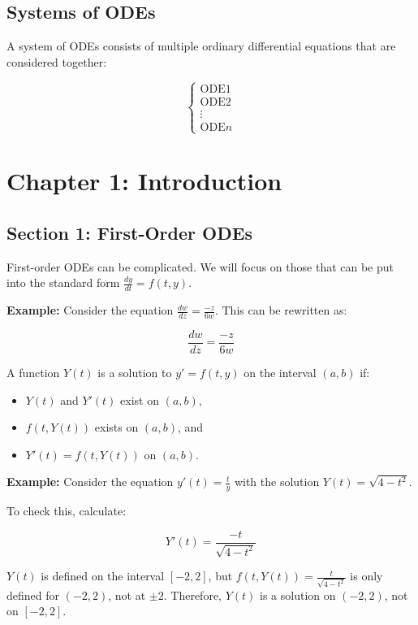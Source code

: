 \documentclass{article}
\begin{document}
\subsection*{Systems of ODEs}

A system of ODEs consists of multiple ordinary differential equations that are considered together:

\[
\left\{
\begin{array}{l}
\text{ODE} 1 \\
\text{ODE} 2 \\
\vdots \\
\text{ODE} n
\end{array}
\right.
\]

\section*{Chapter 1: Introduction}

\subsection*{Section 1: First-Order ODEs}

First-order ODEs can be complicated. We will focus on those that can be put into the standard form \(\boxed{\frac{dy}{dt} = f(t, y)}\).

\textbf{Example:} Consider the equation \(\frac{dw}{dz} = \frac{-z}{6w}\). This can be rewritten as:

\[
\frac{dw}{dz} = \frac{-z}{6w}
\]

A function \(Y(t)\) is a solution to \(y' = f(t, y)\) on the interval \((a, b)\) if:

\begin{itemize}
    \item \(Y(t)\) and \(Y'(t)\) exist on \((a, b)\),
    \item \(f(t, Y(t))\) exists on \((a, b)\), and
    \item \(Y'(t) = f(t, Y(t))\) on \((a, b)\).
\end{itemize}

\textbf{Example:} Consider the equation \(y'(t) = \frac{t}{y}\) with the solution \(Y(t) = \sqrt{4 - t^2}\).

To check this, calculate:

\[
Y'(t) = \frac{-t}{\sqrt{4 - t^2}}
\]

\(Y(t)\) is defined on the interval \([-2, 2]\), but \(f(t, Y(t)) = \frac{t}{\sqrt{4 - t^2}}\) is only defined for \((-2, 2)\), not at \(\pm 2\). Therefore, \(Y(t)\) is a solution on \((-2, 2)\), not on \([-2, 2]\).
\end{document}
